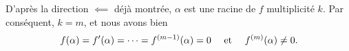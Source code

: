 {	D'après la direction $\impliedby$ déjà montrée, $\alpha$ est une racine de $f$ multiplicité $k$.
	Par conséquent, $k=m$, et nous avons bien
	\begin{align*}
		 f(\alpha) = f'(\alpha) = \cdots = f^{(m-1)}(\alpha) = 0 && \text{ et } && f^{(m)}(\alpha) \neq 0.
	\end{align*}
	
%
%	
%	
}

